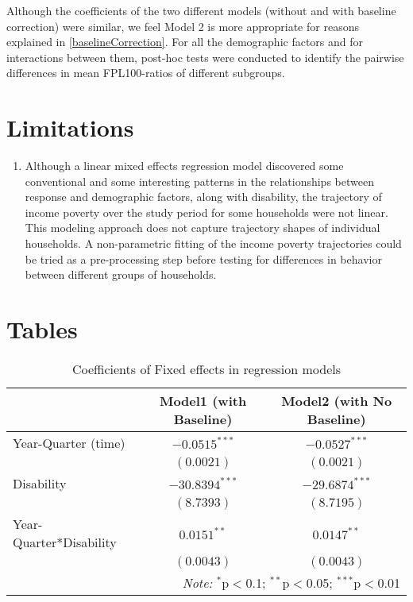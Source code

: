 \documentclass[11pt]{extarticle} %
\begin{document}
Although the coefficients of the two different models (without and with baseline correction) were similar, we feel Model 2 is more appropriate for reasons explained in \ref{baselineCorrection}. For all the demographic factors and for interactions between them, post-hoc tests were conducted to identify the pairwise differences in mean FPL100-ratios of different subgroups. 

\section{Limitations}
\begin{enumerate}
\item Although a linear mixed effects regression model discovered some conventional and some interesting patterns in the relationships between response and demographic factors, along with disability, the trajectory of income poverty over the study period for some households were not linear. This modeling approach does not capture trajectory shapes of individual households. A non-parametric fitting of the income poverty trajectories could be tried as a pre-processing step before testing for differences in behavior between different groups of households. 
\end{enumerate}

\newpage
\section{Tables}

\noindent
\begin{table}[H] 
\centering 
\footnotesize
\begin{tabular}{l|c|c}
\hline 
\hline 
& Model1 (with Baseline) & Model2 (with No Baseline) \\
\hline 
Year-Quarter (time)	&	$-0.0515^{***}$		&	$-0.0527^{***}$ 	\\
			&	$(0.0021)$		&	$(0.0021)$		\\
Disability		&	$-30.8394^{***}$	&	$-29.6874^{***}$	\\    
			&	$(8.7393)$		&	$(8.7195)$		\\
Year-Quarter*Disability	&	$0.0151^{**}$		&	$0.0147^{**}$		\\
			&	$(0.0043)$		&	$(0.0043)$		\\
\hline 
\hline 
\multicolumn{3}{r}{\textit{Note:}  $^{*}$p$<$0.1; $^{**}$p$<$0.05; $^{***}$p$<$0.01} \\ 

\end{tabular}
\caption{Coefficients of Fixed effects in regression models} 
\label{tab:FixedEffectsBetas} 
\end{table}
\end{document}
